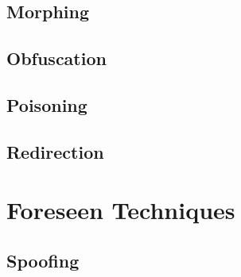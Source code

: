 \documentclass[11pt,fleqn,oneside]{book} %
\begin{document}
\chapter{Morphing} \label{ch:known-morphing}



\chapter{Obfuscation} \label{ch:known-obfuscation}


\newpage
\newpage
\chapter{Poisoning} \label{ch:known-poisoning}


\chapter{Redirection} \label{ch:known-redirection}


\newpage

\part{Foreseen Techniques}
\chapter{Spoofing} \label{ch:foreseen-spoofing}


\end{document}
